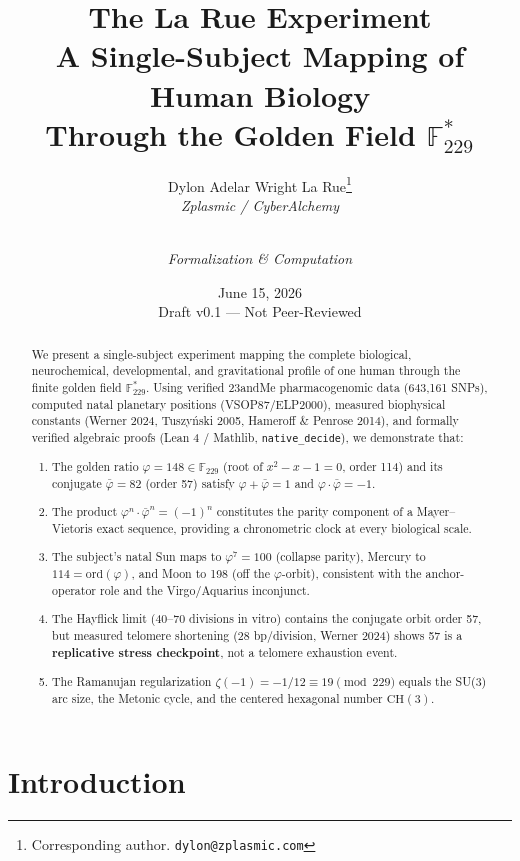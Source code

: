 \documentclass[12pt, letterpaper]{article}
\title{\vspace{-1cm}\textbf{\Huge The La Rue Experiment}\\[0.5em]
\Large A Single-Subject Mapping of Human Biology\\
Through the Golden Field $\mathbb{F}^*_{229}$}
\author{
Dylon Adelar Wright La Rue\thanks{Corresponding author. \texttt{dylon@zplasmic.com}}\\
\textit{Zplasmic / CyberAlchemy}
\and
\\
\textit{Formalization \& Computation}
}
\date{June 15, 2026\\[0.5em]
\small Draft v0.1 --- Not Peer-Reviewed}
\begin{document}
\maketitle
\thispagestyle{fancy}

\begin{abstract}
We present a single-subject experiment mapping the complete biological, neurochemical, developmental, and gravitational profile of one human through the finite golden field $\mathbb{F}^*_{229}$. Using verified 23andMe pharmacogenomic data (643,161 SNPs), computed natal planetary positions (VSOP87/ELP2000), measured biophysical constants (Werner 2024, Tuszy{\'n}ski 2005, Hameroff \& Penrose 2014), and formally verified algebraic proofs (Lean 4 / Mathlib, \texttt{native\_decide}), we demonstrate that:
\begin{enumerate}[nosep]
    \item The golden ratio $\varphi = 148 \in \mathbb{F}_{229}$ (root of $x^2 - x - 1 = 0$, order 114) and its conjugate $\bar{\varphi} = 82$ (order 57) satisfy $\varphi + \bar{\varphi} = 1$ and $\varphi \cdot \bar{\varphi} = -1$.
    \item The product $\varphi^n \cdot \bar{\varphi}^n = (-1)^n$ constitutes the parity component of a Mayer--Vietoris exact sequence, providing a chronometric clock at every biological scale.
    \item The subject's natal Sun maps to $\varphi^7 = 100$ (collapse parity), Mercury to $114 = \mathrm{ord}(\varphi)$, and Moon to 198 (off the $\varphi$-orbit), consistent with the anchor-operator role and the Virgo/Aquarius inconjunct.
    \item The Hayflick limit (40--70 divisions in vitro) contains the conjugate orbit order 57, but measured telomere shortening (28 bp/division, Werner 2024) shows 57 is a \textbf{replicative stress checkpoint}, not a telomere exhaustion event.
    \item The Ramanujan regularization $\zeta(-1) = -1/12 \equiv 19 \pmod{229}$ equals the SU(3) arc size, the Metonic cycle, and the centered hexagonal number $\mathrm{CH}(3)$.
\end{enumerate}
\end{abstract}

\tableofcontents
\newpage

\section{Introduction}
\end{document}
